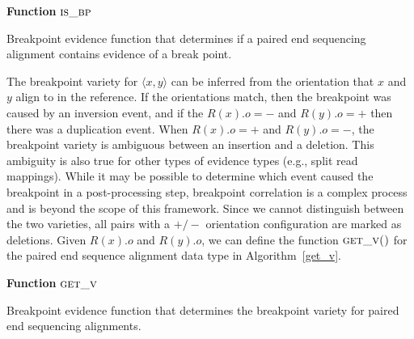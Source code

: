 \documentclass[11pt]{article}
\begin{document}
\begin{algorithm}[H]
    \DontPrintSemicolon
    \footnotesize
    \BlankLine
    \textbf{Function} $\textsc{is\_bp}$\;
	\caption{Breakpoint evidence function that determines if a paired end
			 sequencing alignment contains evidence of a break point.}
    \label{is_bp}
\end{algorithm}

The breakpoint variety for $\langle x,y \rangle$ can be inferred from the 
orientation that $x$ and $y$ align to in the reference.  If the orientations
match, then the breakpoint was caused by an inversion event, and if the
$R(x).o=-$ and $R(y).o=+$ then there was a duplication event.  When $R(x).o=+$
and $R(y).o=-$, the breakpoint variety is ambiguous between an insertion and a
deletion.  This ambiguity is also true for other types of evidence types (e.g.,
split read mappings).  While it may be possible to determine which event caused
the breakpoint in a post-processing step, breakpoint correlation is a complex
process and is beyond the scope of this framework.  Since we cannot distinguish
between the two varieties, all pairs with a $+/-$ orientation configuration are
marked as deletions.  Given $R(x).o$ and $R(y).o$, we can define the
function $\textsc{get\_v()}$ for the paired end sequence alignment
data type in Algorithm~\ref{get_v}.

\begin{algorithm}[H]
    \DontPrintSemicolon
    \footnotesize
    \BlankLine
    \textbf{Function} $\textsc{get\_v}$\;
	\caption{Breakpoint evidence function that determines the breakpoint variety
			 for paired end sequencing alignments.}
    \label{get_v}
\end{algorithm}
\end{document}
